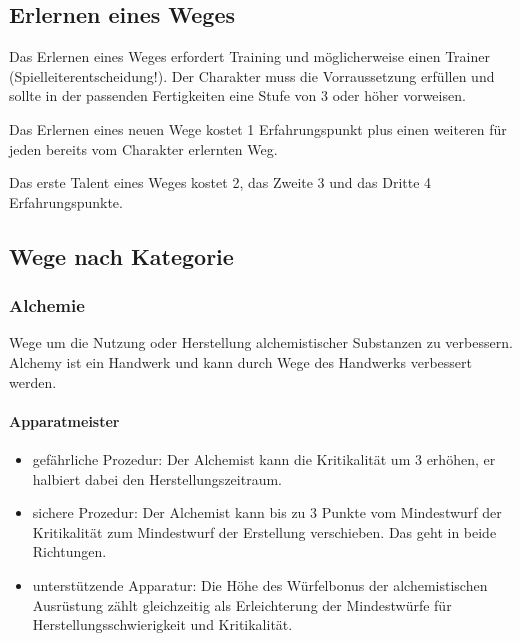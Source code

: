 \documentclass{article}
\begin{document}
\begin{center}
\subsection{Erlernen eines Weges}
\end{center}

Das Erlernen eines Weges erfordert Training und möglicherweise einen Trainer (Spielleiterentscheidung!). Der
Charakter muss die Vorraussetzung erfüllen und sollte in der passenden Fertigkeiten eine Stufe von 3 oder höher
vorweisen.

Das Erlernen eines neuen Wege kostet 1 Erfahrungspunkt plus einen weiteren für jeden bereits vom Charakter erlernten
Weg.

Das erste Talent eines Weges kostet 2, das Zweite 3 und das Dritte 4 Erfahrungspunkte.

\begin{center}
\subsection{Wege nach Kategorie}
\end{center}

\subsubsection{Alchemie}

Wege um die Nutzung oder Herstellung alchemistischer Substanzen zu verbessern. Alchemy ist ein Handwerk und kann
durch Wege des Handwerks verbessert werden.

\paragraph{Apparatmeister}

\begin{itemize}
\item gefährliche Prozedur: Der Alchemist kann die Kritikalität um 3 erhöhen, er halbiert dabei den Herstellungszeitraum.
\item sichere Prozedur: Der Alchemist kann bis zu 3 Punkte vom Mindestwurf der Kritikalität zum Mindestwurf der Erstellung verschieben. Das geht in beide Richtungen.
\item unterstützende Apparatur: Die Höhe des Würfelbonus der alchemistischen Ausrüstung zählt gleichzeitig als Erleichterung der Mindestwürfe für Herstellungsschwierigkeit und Kritikalität.
\end{itemize}
\end{document}
